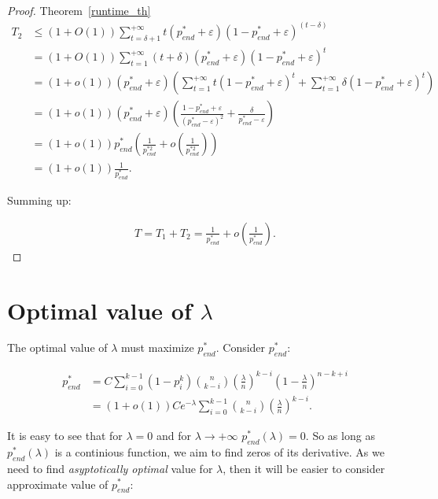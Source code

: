 \documentclass{article}
\begin{document}
\begin{proof}{Theorem~\ref{runtime_th}}
\begin{align*}
  T_2 &\le (1 + O(1)) \sum\limits_{t = \delta + 1}^{+\infty} t (p_{end}^* + \varepsilon) (1 - p_{end}^* + \varepsilon)^{(t - \delta)} \\
  &= (1 + O(1)) \sum\limits_{t = 1}^{+\infty} (t + \delta) (p_{end}^* + \varepsilon) (1 - p_{end}^* + \varepsilon)^t \\
  &= (1 + o(1)) (p_{end}^* + \varepsilon) \left(\sum\limits_{t = 1}^{+\infty} t (1 - p_{end}^* + \varepsilon)^t +  \sum\limits_{t = 1}^{+\infty} \delta (1 - p_{end}^* + \varepsilon)^t \right) \\
  &= (1 + o(1)) (p_{end}^* + \varepsilon) \left( \frac{1 - p_{end}^* + \varepsilon}{(p_{end}^* - \varepsilon)^2} + \frac{\delta}{p_{end}^* - \varepsilon}\right) \\
  &= (1 + o(1)) p_{end}^* \left( \frac{1}{p_{end}^{*2}} + o\left(\frac{1}{p_{end}^{*2}}\right)\right) \\
  &= (1 + o(1))  \frac{1}{p_{end}^*}.
\end{align*}

Summing up:

\begin{align*}
T = T_1 + T_2 = \frac{1}{p_{end}^*} + o\left(\frac{1}{p_{end}^*}\right).
\end{align*}

\end{proof}

\section{Optimal value of $\lambda$}

The optimal value of $\lambda$ must maximize $p_{end}^*$. Consider $p_{end}^*:$

\begin{align*}
p_{end}^* &= C\sum\limits_{i = 0}^{k - 1} (1 - p_i^k) \binom{n}{k - i} \left( \frac{\lambda}{n} \right)^{k - i}  \left(1 - \frac{\lambda}{n} \right)^{n - k + i} \\
&= (1 + o(1))Ce^{-\lambda}\sum\limits_{i = 0}^{k - 1} \binom{n}{k - i} \left( \frac{\lambda}{n} \right)^{k - i}.
\end{align*}

It is easy to see that for $\lambda = 0$ and for $\lambda \to +\infty$ $p_{end}^*(\lambda) = 0$. So as long as $p_{end}^*(\lambda)$ is a continious function, we aim to find zeros of its derivative. As we need to find \textit{asyptotically optimal} value for $\lambda$, then it will be easier to consider approximate value of $p_{end}^*:$
\end{document}
